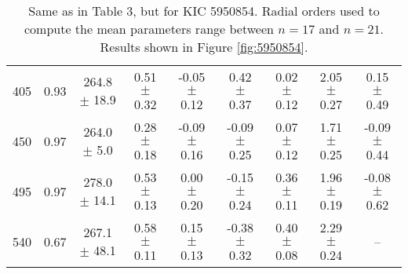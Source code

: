 \documentclass[twocolumn]{aastex61}%
\begin{document}
\begin{table*}[ht]
\begin{tabular}{ccc|ccccc|c}
405 & 0.93 & 264.8 $\pm$ 18.9 & 0.51 $\pm$ 0.32 & -0.05 $\pm$ 0.12 & 0.42 $\pm$ 0.37 & 0.02 $\pm$ 0.12 & 2.05 $\pm$ 0.27 & 0.15 $\pm$ 0.49\\
450 & 0.97 & 264.0 $\pm$ 5.0 & 0.28 $\pm$ 0.18 & -0.09 $\pm$ 0.16 & -0.09 $\pm$ 0.25 & 0.07 $\pm$ 0.12 & 1.71 $\pm$ 0.25 & -0.09 $\pm$ 0.44\\
495 & 0.97 & 278.0 $\pm$ 14.1 & 0.53 $\pm$ 0.13 & 0.00 $\pm$ 0.20 & -0.15 $\pm$ 0.24 & 0.36 $\pm$ 0.11 & 1.96 $\pm$ 0.19 & -0.08 $\pm$ 0.62\\
540 & 0.67 & 267.1 $\pm$ 48.1 & 0.58 $\pm$ 0.11 & 0.15 $\pm$ 0.13 & -0.38 $\pm$ 0.32 & 0.40 $\pm$ 0.08 & 2.29 $\pm$ 0.24 & --\\
\end{tabular}
\caption{Same as in Table 3, but for KIC 5950854. Radial orders used to compute the mean parameters range between $n=17$ and $n=21$. Results shown in Figure \ref{fig:5950854}.}\label{tab:5950854}
\end{table*}
\end{document}
